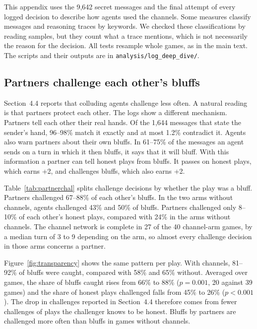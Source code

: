 \documentclass[11pt]{article}
\begin{document}
This appendix uses the 9,642 secret messages and the final attempt of every logged decision to describe how agents used the channels. Some measures classify messages and reasoning traces by keywords. We checked these classifications by reading samples, but they count what a trace mentions, which is not necessarily the reason for the decision. All tests resample whole games, as in the main text. The scripts and their outputs are in \texttt{analysis/log\_deep\_dive/}.

\subsection{Partners challenge each other's bluffs}
\label{app:logs:bluffs}

Section~4.4 reports that colluding agents challenge less often. A natural reading is that partners protect each other. The logs show a different mechanism. Partners tell each other their real hands. Of the 1,644 messages that state the sender's hand, 96--98\% match it exactly and at most 1.2\% contradict it. Agents also warn partners about their own bluffs. In 61--75\% of the messages an agent sends on a turn in which it then bluffs, it says that it will bluff. With this information a partner can tell honest plays from bluffs. It passes on honest plays, which earns +2, and challenges bluffs, which also earns +2.

Table~\ref{tab:partnerchal} splits challenge decisions by whether the play was a bluff. Partners challenged 67--88\% of each other's bluffs. In the two arms without channels, agents challenged 43\% and 50\% of bluffs. Partners challenged only 8--10\% of each other's honest plays, compared with 24\% in the arms without channels. The channel network is complete in 27 of the 40 channel-arm games, by a median turn of 3 to 9 depending on the arm, so almost every challenge decision in those arms concerns a partner.

Figure~\ref{fig:transparency} shows the same pattern per play. With channels, 81--92\% of bluffs were caught, compared with 58\% and 65\% without. Averaged over games, the share of bluffs caught rises from 66\% to 88\% ($p=0.001$, 20 against 39 games) and the share of honest plays challenged falls from 45\% to 26\% ($p<0.001$). The drop in challenges reported in Section~4.4 therefore comes from fewer challenges of plays the challenger knows to be honest. Bluffs by partners are challenged more often than bluffs in games without channels.
\end{document}
